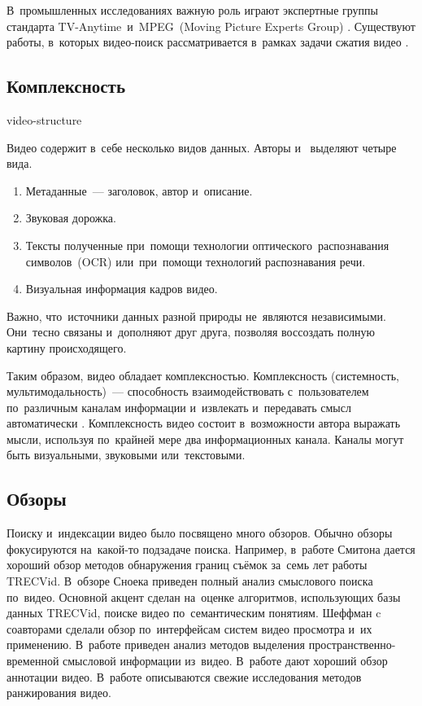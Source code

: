 В~промышленных исследованиях важную роль играют экспертные группы
стандарта TV-Anytime\ и~MPEG~(Moving
Picture Experts Group) \cite{Pereira:2008}.
Существуют работы, в~которых видео-поиск рассматривается
в~рамках задачи сжатия видео \cite{Babu:2007}.


\subsection{Комплексность}

\begin{figuredt}
    {video-structure}
\end{figuredt}

Видео содержит в~себе несколько видов данных.
Авторы \cite{Chung:2007:PAU} и~\cite{smeaton:2006} выделяют четыре вида.
\begin{enumerate}
    \item   Метаданные~— заголовок, автор и~описание.
    \item   Звуковая дорожка.
    \item   Тексты полученные при~помощи технологии
            оптического\
            распознавания символов\
            (OCR) или~при~помощи технологий
            распознавания речи\index{Распознавание! речи}.
    \item   Визуальная информация кадров видео.
\end{enumerate}
Важно, что~источники данных разной природы не~являются независимыми.
Они~тесно связаны и~дополняют друг друга, позволяя воссоздать полную
картину происходящего.

Таким образом, видео обладает комплексностью.
Комплексность (системность, мультимодальность)~— способность взаимодействовать
с~пользователем по~различным каналам информации
и~извлекать и~передавать смысл автоматически \cite{Nigay:1993}.
Комплексность видео состоит в~возможности автора выражать мысли,
используя по~крайней мере два информационных канала.
Каналы могут быть визуальными, звуковыми или~текстовыми.

\subsection{Обзоры}

Поиску и~индексации видео было посвящено много обзоров.
Обычно обзоры фокусируются на~какой-то подзадаче поиска.
Например, в~работе Смитона \cite{Smeaton:2010} дается хороший обзор
методов обнаружения границ съёмок за~семь лет работы TRECVid.
В~обзоре Сноека \cite{Snoek:2009} приведен
полный анализ смыслового поиска по~видео.
Основной акцент сделан на~оценке алгоритмов,
использующих базы данных TRECVid,
поиске видео по~семантическим понятиям.
Шеффман c соавторами \cite{Schoeffmann:2010} сделали
обзор по~интерфейсам систем видео просмотра и~их применению.
В~работе \cite{Ren:2009} приведен анализ методов
выделения пространственно-временной смысловой информации из~видео.
В~работе \cite{Zhang:2012} дают хороший обзор аннотации видео.
В~работе \cite{XinmieTian:2011} описываются свежие исследования
методов ранжирования видео.

